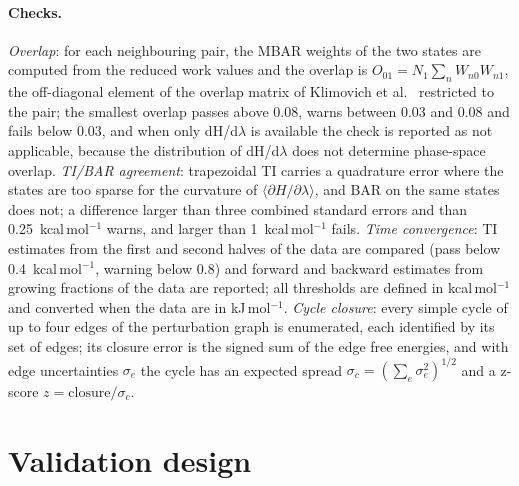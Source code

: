\documentclass[9pt,lessons]{livecoms}
\begin{document}
\paragraph{Checks.}
\emph{Overlap}: for each neighbouring pair, the MBAR weights of the two states \cite{shirts2008} are computed from the reduced work values and the overlap is $O_{01} = N_1 \sum_n W_{n0} W_{n1}$, the off-diagonal element of the overlap matrix of Klimovich et al.\ \cite{klimovich2015} restricted to the pair; the smallest overlap passes above 0.08, warns between 0.03 and 0.08 and fails below 0.03, and when only dH/d$\lambda$ is available the check is reported as not applicable, because the distribution of dH/d$\lambda$ does not determine phase-space overlap. \emph{TI/BAR agreement}: trapezoidal TI carries a quadrature error where the states are too sparse for the curvature of $\langle \partial H/\partial\lambda\rangle$, and BAR on the same states does not; a difference larger than three combined standard errors and than 0.25~kcal\,mol$^{-1}$ warns, and larger than 1~kcal\,mol$^{-1}$ fails. \emph{Time convergence}: TI estimates from the first and second halves of the data are compared (pass below 0.4~kcal\,mol$^{-1}$, warning below 0.8) and forward and backward estimates from growing fractions of the data are reported; all thresholds are defined in kcal\,mol$^{-1}$ and converted when the data are in kJ\,mol$^{-1}$. \emph{Cycle closure}: every simple cycle of up to four edges of the perturbation graph is enumerated, each identified by its set of edges; its closure error is the signed sum of the edge free energies, and with edge uncertainties $\sigma_e$ the cycle has an expected spread $\sigma_c = (\sum_e \sigma_e^2)^{1/2}$ and a z-score $z = \text{closure}/\sigma_c$.

\section{Validation design}
\end{document}
